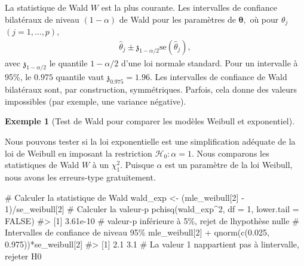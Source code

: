 \documentclass[
  11pt,
  letterpaper,
]{scrbook}
\newenvironment{Shaded}{\begin{snugshade}}{\end{snugshade}}
\newcommand{\AttributeTok}[1]{\textcolor[rgb]{0.40,0.45,0.13}{#1}}
\newcommand{\CommentTok}[1]{\textcolor[rgb]{0.37,0.37,0.37}{#1}}
\newcommand{\ConstantTok}[1]{\textcolor[rgb]{0.56,0.35,0.01}{#1}}
\newcommand{\DecValTok}[1]{\textcolor[rgb]{0.68,0.00,0.00}{#1}}
\newcommand{\FloatTok}[1]{\textcolor[rgb]{0.68,0.00,0.00}{#1}}
\newcommand{\FunctionTok}[1]{\textcolor[rgb]{0.28,0.35,0.67}{#1}}
\newcommand{\NormalTok}[1]{\textcolor[rgb]{0.00,0.23,0.31}{#1}}
\newcommand{\OtherTok}[1]{\textcolor[rgb]{0.00,0.23,0.31}{#1}}
\newcommand{\SpecialCharTok}[1]{\textcolor[rgb]{0.37,0.37,0.37}{#1}}
\theoremstyle{plain}
\theoremstyle{plain}
\theoremstyle{definition}
\newtheorem{example}{Exemple}[chapter]
\theoremstyle{definition}
\theoremstyle{remark}
\begin{document}
La statistique de Wald \(W\) est la plus courante. Les intervalles de
confiance bilatéraux de niveau \((1-\alpha)\) de Wald pour les
paramètres de \(\boldsymbol{\theta},\) où pour \(\theta_j\)
\((j=1, \ldots, p),\) \begin{align*}
\widehat{\theta}_j \pm \mathfrak{z}_{1-\alpha/2}\mathrm{se}(\widehat{\theta}_j),
\end{align*} avec \(\mathfrak{z}_{1-\alpha/2}\) le quantile
\(1-\alpha/2\) d'une loi normale standard. Pour un intervalle à 95\%, le
\(0.975\) quantile vaut \(\mathfrak{z}_{0.975}=1.96.\) Les intervalles
de confiance de Wald bilatéraux sont, par construction, symmétriques.
Parfois, cela donne des valeurs impossibles (par exemple, une variance
négative).

\begin{example}[Test de Wald pour comparer les modèles Weibull et
exponentiel]\protect\hypertarget{exm-weibull-exponentiel-sousmodele}{}\label{exm-weibull-exponentiel-sousmodele}

Nous pouvons tester si la loi exponentielle est une simplification
adéquate de la loi de Weibull en imposant la restriction
\(\mathscr{H}_0: \alpha=1.\) Nous comparons les statistiques de Wald
\(W\) à un \(\chi^2_1.\) Puisque \(\alpha\) est un paramètre de la loi
Weibull, nous avons les erreurs-type gratuitement.

\begin{Shaded}
\begin{Highlighting}[]
\CommentTok{\# Calculer la statistique de Wald}
\NormalTok{wald\_exp }\OtherTok{\textless{}{-}}\NormalTok{ (mle\_weibull[}\DecValTok{2}\NormalTok{] }\SpecialCharTok{{-}} \DecValTok{1}\NormalTok{)}\SpecialCharTok{/}\NormalTok{se\_weibull[}\DecValTok{2}\NormalTok{]}
\CommentTok{\# Calculer la valeur{-}p}
\FunctionTok{pchisq}\NormalTok{(wald\_exp}\SpecialCharTok{\^{}}\DecValTok{2}\NormalTok{, }\AttributeTok{df =} \DecValTok{1}\NormalTok{, }\AttributeTok{lower.tail =} \ConstantTok{FALSE}\NormalTok{)}
\CommentTok{\#\textgreater{} [1] 3.61e{-}10}
\CommentTok{\# valeur{-}p inférieure à 5\%, rejet de l\textquotesingle{}hypothèse nulle}
\CommentTok{\# Intervalles de confiance de niveau 95\%}
\NormalTok{mle\_weibull[}\DecValTok{2}\NormalTok{] }\SpecialCharTok{+} \FunctionTok{qnorm}\NormalTok{(}\FunctionTok{c}\NormalTok{(}\FloatTok{0.025}\NormalTok{, }\FloatTok{0.975}\NormalTok{))}\SpecialCharTok{*}\NormalTok{se\_weibull[}\DecValTok{2}\NormalTok{]}
\CommentTok{\#\textgreater{} [1] 2.1 3.1}
\CommentTok{\# La valeur 1 n\textquotesingle{}appartient pas à l\textquotesingle{}intervalle, rejeter H0}
\end{Highlighting}
\end{Shaded}


\end{example}
\end{document}
